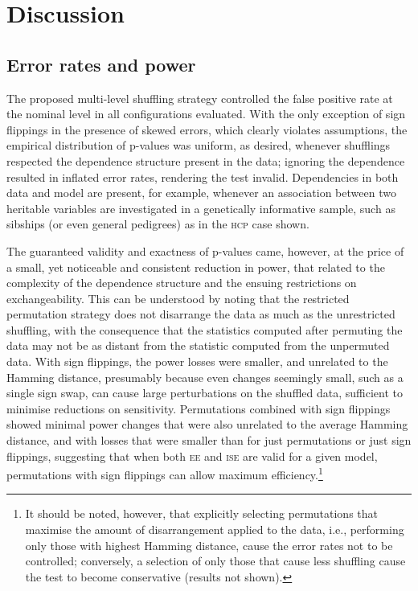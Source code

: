 \section{Discussion}

\subsection{Error rates and power}

The proposed multi-level shuffling strategy controlled the false positive rate at the nominal level in all configurations evaluated. With the only exception of sign flippings in the presence of skewed errors, which clearly violates assumptions, the empirical distribution of p-values was uniform, as desired, whenever shufflings respected the dependence structure present in the data; ignoring the dependence resulted in inflated error rates, rendering the test invalid. Dependencies in both data and model are present, for example, whenever an association between two heritable variables are investigated in a genetically informative sample, such as sibships (or even general pedigrees) as in the \textsc{hcp} case shown.

The guaranteed validity and exactness of p-values came, however, at the price of a small, yet noticeable and consistent reduction in power, that related to the complexity of the dependence structure and the ensuing restrictions on exchangeability. This can be understood by noting that the restricted permutation strategy does not disarrange the data as much as the unrestricted shuffling, with the consequence that the statistics computed after permuting the data may not be as distant from the statistic computed from the unpermuted data. With sign flippings, the power losses were smaller, and unrelated to the Hamming distance, presumably because even changes seemingly small, such as a single sign swap, can cause large perturbations on the shuffled data, sufficient to minimise reductions on sensitivity. Permutations combined with sign flippings showed minimal power changes that were also unrelated to the average Hamming distance, and with losses that were smaller than for just permutations or just sign flippings, suggesting that when both \textsc{ee} and \textsc{ise} are valid for a given model, permutations with sign flippings can allow maximum efficiency.\footnote{It should be noted, however, that explicitly selecting permutations that maximise the amount of disarrangement applied to the data, i.e., performing only those with highest Hamming distance, cause the error rates not to be controlled; conversely, a selection of only those that cause less shuffling cause the test to become conservative (results not shown).}

